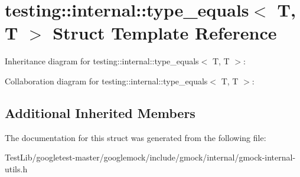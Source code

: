 \hypertarget{structtesting_1_1internal_1_1type__equals_3_01T_00_01T_01_4}{}\section{testing\+:\+:internal\+:\+:type\+\_\+equals$<$ T, T $>$ Struct Template Reference}
\label{structtesting_1_1internal_1_1type__equals_3_01T_00_01T_01_4}


Inheritance diagram for testing\+:\+:internal\+:\+:type\+\_\+equals$<$ T, T $>$\+:


Collaboration diagram for testing\+:\+:internal\+:\+:type\+\_\+equals$<$ T, T $>$\+:
\subsection*{Additional Inherited Members}


The documentation for this struct was generated from the following file\+:\begin{DoxyCompactItemize}
\item 
Test\+Lib/googletest-\/master/googlemock/include/gmock/internal/gmock-\/internal-\/utils.\+h\end{DoxyCompactItemize}
